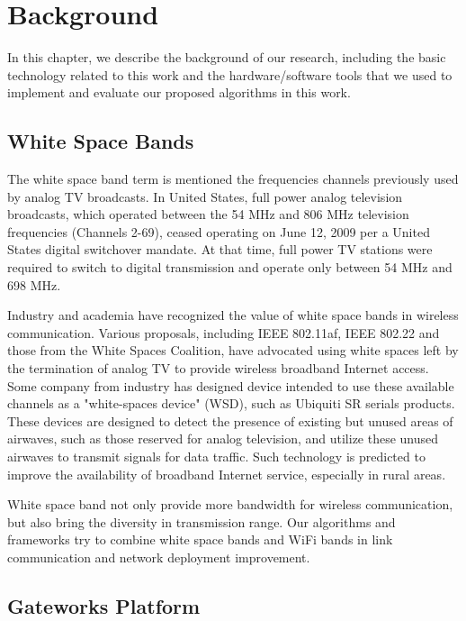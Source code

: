 \chapter{Background} \label{ch:background}

In this chapter, we describe the background of our research, including the basic
technology related to this work and the hardware/software tools that we used to
implement and evaluate our proposed algorithms in this work.


\section{White Space Bands}


The white space band term is mentioned the frequencies 
channels previously used by analog TV broadcasts.
In United States, full power analog television broadcasts, 
which operated between the 54 MHz and 806 MHz television 
frequencies (Channels 2-69), ceased operating on June 12, 
2009 per a United States digital switchover mandate. At that 
time, full power TV stations were required to switch to digital 
transmission and operate only between 54 MHz and 698 MHz.~\cite{fccwhitespace} 

Industry and academia have recognized the value of white space bands
in wireless communication. Various proposals, including IEEE 802.11af, 
IEEE 802.22 and those from the White Spaces Coalition, 
have advocated using white spaces left by the termination of 
analog TV to provide wireless broadband 
Internet access. 
Some company from industry has designed device intended to use these available channels 
as a "white-spaces device" (WSD), such as Ubiquiti SR serials products. 
These devices are designed to 
detect the presence of existing but unused areas of airwaves, such 
as those reserved for analog television, and utilize these unused 
airwaves to transmit signals for data traffic. 
Such technology is predicted to improve the availability of 
broadband Internet service, especially in rural areas.

White space band not only provide more bandwidth for wireless
communication, but also bring the diversity in transmission range.
Our algorithms and frameworks try to combine white space bands 
and WiFi bands in link communication and network deployment improvement.


\section{Gateworks Platform}

